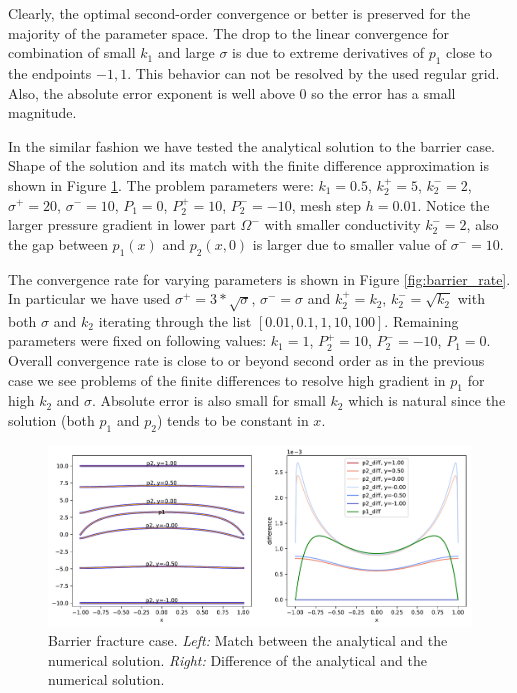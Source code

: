 \documentclass{elsarticle}
\begin{document}
Clearly, the optimal second-order convergence or better is preserved for the majority of the parameter space. The drop to the linear convergence for combination 
of small $k_1$ and large $\sigma$ is due to extreme derivatives of $p_1$ close to the endpoints ${-1, 1}$. This behavior can not be resolved by the used regular grid.
Also, the absolute error exponent is well above $0$ so the error has a small magnitude. 

In the similar fashion we have tested the analytical solution to the barrier case. Shape of the solution and its match with the finite difference approximation 
is shown in Figure \ref{fig:barrier_solution}. The problem parameters were: $k_1=0.5$, $k_2^+=5$, $k_2^-=2$, $\sigma^+=20$, $\sigma^-=10$, $P_1=0$, 
$P_2^+=10$, $P_2^-=-10$, mesh step $h=0.01$. Notice the larger pressure gradient in lower part $\Omega^-$ with smaller conductivity $k_2^- = 2$, also the gap between 
$p_1(x)$ and $p_2(x, 0)$ is larger due to smaller value of $\sigma^- = 10$. 

The convergence rate for varying parameters is shown in Figure \ref{fig:barrier_rate}. In particular we have used $\sigma^+ = 3*\sqrt{\sigma}$, $\sigma^- = \sigma$
and $k_2^+ = k_2$, $k_2^- = \sqrt{k_2}$ with both $\sigma$ and $k_2$ iterating through the list $[0.01, 0.1, 1, 10, 100]$. Remaining parameters were fixed on 
following values: $k_1=1$, $P_2^+=10$, $P_2^-=-10$, $P_1=0$. Overall convergence rate is close to or beyond second order as in the previous case we see problems 
of the finite differences to resolve high gradient in $p_1$ for high $k_2$ and $\sigma$. Absolute error is also small for small $k_2$ which is natural since the 
solution (both $p_1$ and $p_2$) tends to be constant in $x$. 

\begin{figure}
  \label{fig:barrier_solution}
  \centering
  \includegraphics[width=\textwidth, keepaspectratio=true]{./barrier_solution.pdf}
  \caption{Barrier fracture case.
  {\it Left:} Match between the analytical and the numerical solution. 
  {\it Right:} Difference of the analytical and the numerical solution.}
\end{figure}
\end{document}
